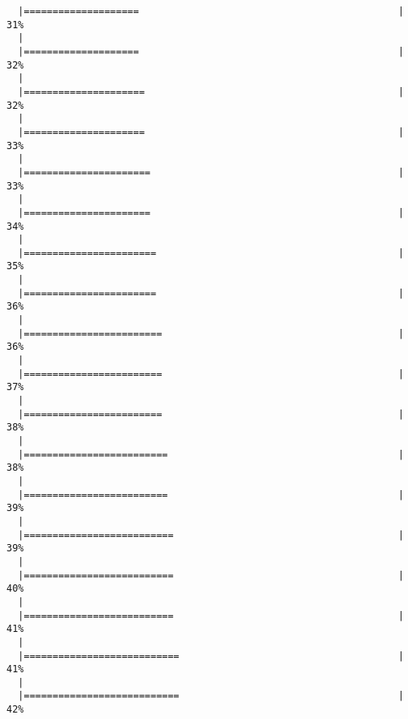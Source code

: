 \begin{knitrout}
\begin{kframe}
\begin{verbatim}
  |====================                                             |  31%
  |                                                                       
  |====================                                             |  32%
  |                                                                       
  |=====================                                            |  32%
  |                                                                       
  |=====================                                            |  33%
  |                                                                       
  |======================                                           |  33%
  |                                                                       
  |======================                                           |  34%
  |                                                                       
  |=======================                                          |  35%
  |                                                                       
  |=======================                                          |  36%
  |                                                                       
  |========================                                         |  36%
  |                                                                       
  |========================                                         |  37%
  |                                                                       
  |========================                                         |  38%
  |                                                                       
  |=========================                                        |  38%
  |                                                                       
  |=========================                                        |  39%
  |                                                                       
  |==========================                                       |  39%
  |                                                                       
  |==========================                                       |  40%
  |                                                                       
  |==========================                                       |  41%
  |                                                                       
  |===========================                                      |  41%
  |                                                                       
  |===========================                                      |  42%

\end{verbatim}
\end{kframe}
\end{knitrout}
